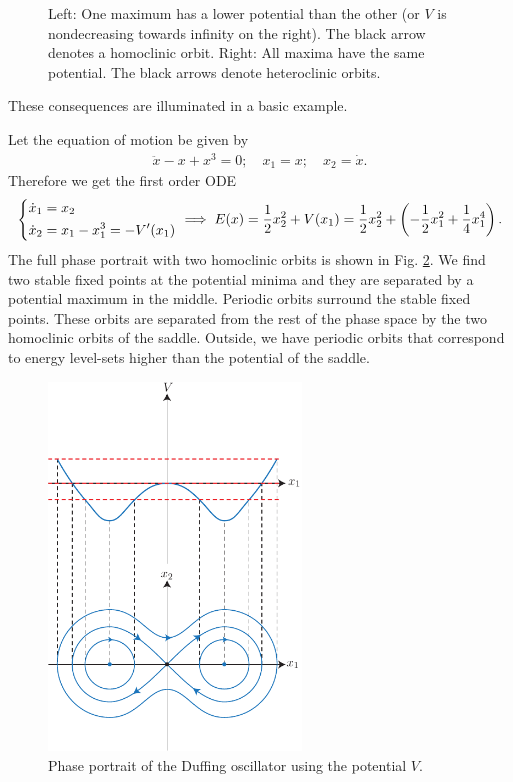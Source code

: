 \begin{enumerate}
\begin{figure}[h!]
		\caption{Left: One maximum has a lower potential than the other (or $V$ is nondecreasing towards infinity on the right). The black arrow denotes a homoclinic orbit. Right: All maxima have the same potential. The black arrows denote heteroclinic orbits.}
		\label{fig:mech_limit_case}
	\end{figure}
	
\end{enumerate}

These consequences are illuminated in a basic example.
\begin{ex}
Let the equation of motion be given by
\begin{align}
\ddot{x}-x+x^3=0;\quad x_1=x;\quad x_2=\dot{x}.	
\end{align}
Therefore we get the first order ODE
\begin{align}
	\begin{dcases}
		\dot{x}_1 = x_2 \\
		\dot{x}_2 = x_1 - x_1^3 = - V'(x_1)
	\end{dcases}
	\implies E(x) = \frac{1}{2}x_2^2+ V(x_1) = \frac{1}{2}x_2^2 + \left( - \frac{1}{2}x_1^2 + \frac{1}{4}x_1^4\right).	
\end{align}
The full phase portrait with two homoclinic orbits is shown in Fig. \ref{fig:duffing_phase_portrait}. 
We find two stable fixed points at the potential minima and they are separated by a potential maximum in the middle. Periodic orbits surround the stable fixed points. These orbits are separated from the rest of the phase space by the two homoclinic orbits of the saddle. Outside, we have periodic orbits that correspond to energy level-sets higher than the potential of the saddle. 
\begin{figure}[h!]
	\centering
	\includegraphics[width=0.6\textwidth]{figures/ch4/5duffing_phase_portrait.pdf}
	\caption{Phase portrait of the Duffing oscillator using the potential $V$.}
	\label{fig:duffing_phase_portrait}
\end{figure}

\end{ex}

